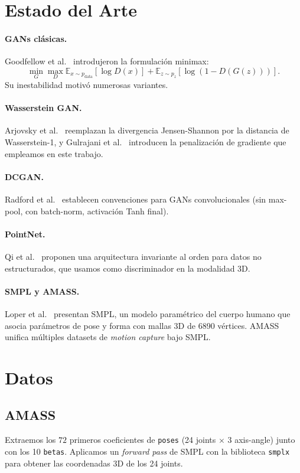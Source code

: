 \documentclass[11pt,a4paper,twocolumn]{article}
\begin{document}
\section{Estado del Arte}

\paragraph{GANs clásicas.} Goodfellow et al.~\cite{goodfellow2014}
introdujeron la formulación minimax:
\[
\min_G \max_D \mathbb{E}_{x\sim p_{\text{data}}}[\log D(x)]
+ \mathbb{E}_{z\sim p_z}[\log(1-D(G(z)))].
\]
Su inestabilidad motivó numerosas variantes.

\paragraph{Wasserstein GAN.} Arjovsky et al.~\cite{arjovsky2017wgan}
reemplazan la divergencia Jensen-Shannon por la distancia de
Wasserstein-1, y Gulrajani et al.~\cite{gulrajani2017wgangp} introducen
la penalización de gradiente que empleamos en este trabajo.

\paragraph{DCGAN.} Radford et al.~\cite{radford2015dcgan} establecen
convenciones para GANs convolucionales (sin max-pool, con batch-norm,
activación Tanh final).

\paragraph{PointNet.} Qi et al.~\cite{qi2017pointnet} proponen una
arquitectura invariante al orden para datos no estructurados, que usamos
como discriminador en la modalidad 3D.

\paragraph{SMPL y AMASS.} Loper et al.~\cite{loper2015smpl} presentan
SMPL, un modelo paramétrico del cuerpo humano que asocia parámetros de
pose y forma con mallas 3D de 6890 vértices. AMASS \cite{AMASS} unifica
múltiples datasets de \textit{motion capture} bajo SMPL.

\section{Datos}

\subsection{AMASS}
Extraemos los $72$ primeros coeficientes de \texttt{poses} (24 joints
$\times$ 3 axis-angle) junto con los 10 \texttt{betas}. Aplicamos un
\textit{forward pass} de SMPL con la biblioteca \texttt{smplx} para
obtener las coordenadas 3D de los 24 joints.
\end{document}
